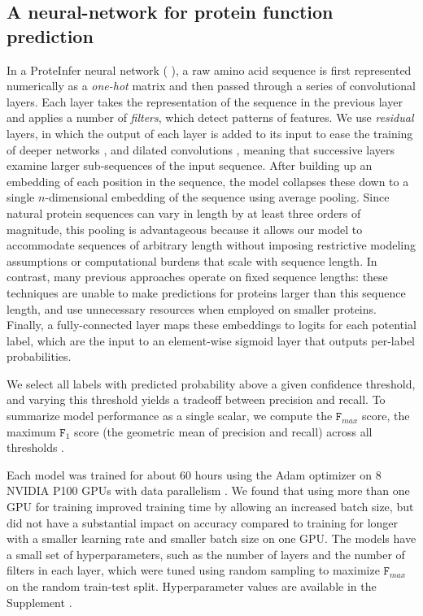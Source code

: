 \subsection*{A neural-network for protein function prediction}

In a ProteInfer neural network (%
), a raw amino acid sequence is first represented numerically as a \textit{one-hot} matrix and then passed through a series of convolutional layers. Each layer takes the representation of the sequence in the previous layer and applies a number of \textit{filters}, which detect patterns of features. We use \textit{residual} layers, in which the output of each layer is added to its input to ease the training of deeper networks \cite{resnet}, and dilated convolutions \cite{dilatedconvolutions}, meaning that successive layers examine larger sub-sequences of the input sequence. After building up an embedding of each position in the sequence, the model collapses these down to a single $n$-dimensional embedding of the sequence using average pooling. Since natural protein sequences can vary in length by at least three orders of magnitude, this pooling is advantageous because it allows our model to accommodate sequences of arbitrary length without imposing restrictive modeling assumptions or computational burdens that scale with sequence length. In contrast, many previous approaches operate on fixed sequence lengths: these techniques are unable to make predictions for proteins larger than this sequence length, and use unnecessary resources when employed on smaller proteins. Finally, a fully-connected layer maps these embeddings to logits for each potential label, which are the input to an element-wise sigmoid layer that outputs per-label probabilities. 


We select all labels with predicted probability above a given confidence threshold, and varying this threshold yields a tradeoff between precision and recall. To summarize model performance as a single scalar, we compute the $\texttt{F}_{max}$ score, the maximum $\texttt{F}_{1}$ score (the geometric mean of precision and recall) across all thresholds \citep{radivojac2013large}.  





Each model was trained for about 60 hours using the Adam optimizer \citep{kingma2014adam} on 8 NVIDIA P100 GPUs with data parallelism \cite{dean2012large, dataparalellism}.  We found that using more than one GPU for training improved training time by allowing an increased batch size, but did not have a substantial impact on accuracy compared to training for longer with a smaller learning rate and smaller batch size on one GPU. The models have a small set of hyperparameters, such as the number of layers and the number of filters in each layer, which were tuned using random sampling to maximize $\texttt{F}_{max}$ on the random train-test split. Hyperparameter values are available in the \textnormal{ Supplement}%
.


